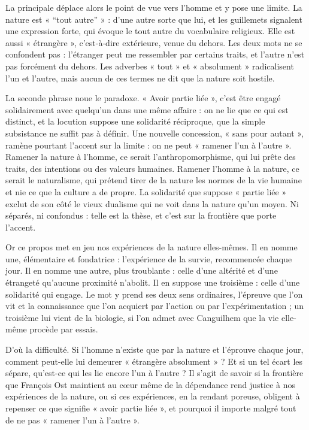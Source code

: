 \documentclass[11pt,a4paper]{article}
\begin{document}
La principale déplace alors le point de vue vers l'homme et y pose une limite. La nature est « ``tout autre'' » : d'une autre sorte que lui, et les guillemets signalent une expression forte, qui évoque le tout autre du vocabulaire religieux. Elle est aussi « étrangère », c'est-à-dire extérieure, venue du dehors. Les deux mots ne se confondent pas : l'étranger peut me ressembler par certains traits, et l'autre n'est pas forcément du dehors. Les adverbes « tout » et « absolument » radicalisent l'un et l'autre, mais aucun de ces termes ne dit que la nature soit hostile.

La seconde phrase noue le paradoxe. « Avoir partie liée », c'est être engagé solidairement avec quelqu'un dans une même affaire : on ne lie que ce qui est distinct, et la locution suppose une solidarité réciproque, que la simple subsistance ne suffit pas à définir. Une nouvelle concession, « sans pour autant », ramène pourtant l'accent sur la limite : on ne peut « ramener l'un à l'autre ». Ramener la nature à l'homme, ce serait l'anthropomorphisme, qui lui prête des traits, des intentions ou des valeurs humaines. Ramener l'homme à la nature, ce serait le naturalisme, qui prétend tirer de la nature les normes de la vie humaine et nie ce que la culture a de propre. La solidarité que suppose « partie liée » exclut de son côté le vieux dualisme qui ne voit dans la nature qu'un moyen. Ni séparés, ni confondus : telle est la thèse, et c'est sur la frontière que porte l'accent.

Or ce propos met en jeu nos expériences de la nature elles-mêmes. Il en nomme une, élémentaire et fondatrice : l'expérience de la survie, recommencée chaque jour. Il en nomme une autre, plus troublante : celle d'une altérité et d'une étrangeté qu'aucune proximité n'abolit. Il en suppose une troisième : celle d'une solidarité qui engage. Le mot y prend ses deux sens ordinaires, l'épreuve que l'on vit et la connaissance que l'on acquiert par l'action ou par l'expérimentation ; un troisième lui vient de la biologie, si l'on admet avec Canguilhem que la vie elle-même procède par essais.

D'où la difficulté. Si l'homme n'existe que par la nature et l'éprouve chaque jour, comment peut-elle lui demeurer « étrangère absolument » ? Et si un tel écart les sépare, qu'est-ce qui les lie encore l'un à l'autre ? Il s'agit de savoir si la frontière que François Ost maintient au cœur même de la dépendance rend justice à nos expériences de la nature, ou si ces expériences, en la rendant poreuse, obligent à repenser ce que signifie « avoir partie liée », et pourquoi il importe malgré tout de ne pas « ramener l'un à l'autre ».
\end{document}
